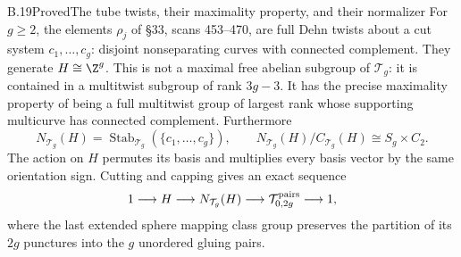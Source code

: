 \begin{claim}{B.19}{Proved}{The tube twists, their maximality property, and their normalizer}
For $g\ge2$, the elements $\rho_j$ of \S33, scans 453--470, are full Dehn twists
about a cut system $c_1,\ldots,c_g$: disjoint nonseparating curves with connected
complement. They generate $H\cong\Z^g$. This is not a maximal free abelian
subgroup of $\mathcal T_g$: it is contained in a multitwist subgroup of rank
$3g-3$. It has the precise maximality property of being a full multitwist group
of largest rank whose supporting multicurve has connected complement.
Furthermore
\[
 N_{\mathcal T_g}(H)=\operatorname{Stab}_{\mathcal T_g}(\{c_1,\ldots,c_g\}),
 \qquad N_{\mathcal T_g}(H)/C_{\mathcal T_g}(H)\cong S_g\times C_2.
\]
The action on $H$ permutes its basis and multiplies every basis vector by the
same orientation sign. Cutting and capping gives an exact sequence
\[
 1\longrightarrow H\longrightarrow N_{\mathcal T_g}(H)
 \longrightarrow\mathcal T^{\rm pairs}_{0,2g}\longrightarrow1,
\]
where the last extended sphere mapping class group preserves the partition of
its $2g$ punctures into the $g$ unordered gluing pairs.
\end{claim}
